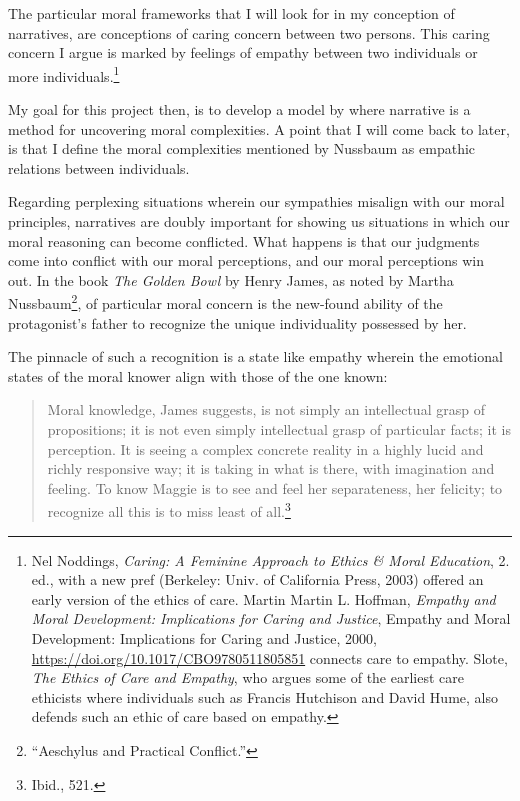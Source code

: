 \documentclass[phdthesis,12pt,final]{wuthesis}
\theoremstyle{definition}
\theoremstyle{definition}
\theoremstyle{definition}
\theoremstyle{definition}
\theoremstyle{remark}
\begin{document}
The particular moral frameworks that I will look for in my conception of narratives, are conceptions of caring concern between two persons. This caring concern I argue is marked by feelings of empathy between two individuals or more individuals.\footnote{Nel Noddings, \emph{Caring: A Feminine Approach to Ethics \& Moral Education}, 2. ed., with a new pref (Berkeley: Univ. of California Press, 2003) offered an early version of the ethics of care. Martin Martin L. Hoffman, \emph{Empathy and Moral Development: {Implications} for Caring and Justice}, Empathy and Moral Development: {Implications} for Caring and Justice, 2000, \url{https://doi.org/10.1017/CBO9780511805851} connects care to empathy. Slote, \emph{The {Ethics} of {Care} and {Empathy}}, who argues some of the earliest care ethicists where individuals such as Francis Hutchison and David Hume, also defends such an ethic of care based on empathy.}

My goal for this project then, is to develop a model by where narrative is a method for uncovering moral complexities. A point that I will come back to later, is that I define the moral complexities mentioned by Nussbaum as empathic relations between individuals.

Regarding perplexing situations wherein our sympathies misalign with our moral principles, narratives are doubly important for showing us situations in which our moral reasoning can become conflicted. What happens is that our judgments come into conflict with our moral perceptions, and our moral perceptions win out. In the book \emph{The Golden Bowl} by Henry James, as noted by Martha Nussbaum\footnote{{``Aeschylus and Practical Conflict.''}}, of particular moral concern is the new-found ability of the protagonist's father to recognize the unique individuality possessed by her.

The pinnacle of such a recognition is a state like empathy wherein the emotional states of the moral knower align with those of the one known:

\begin{quote}
Moral knowledge, James suggests, is not simply an intellectual grasp of propositions; it is not even simply intellectual grasp of particular facts; it is perception. It is seeing a complex concrete reality in a highly lucid and richly responsive way; it is taking in what is there, with imagination and feeling. To know Maggie is to see and feel her separateness, her felicity; to recognize all this is to miss least of all.\footnote{Ibid., 521.}
\end{quote}
\end{document}

